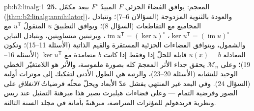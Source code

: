 \begin{solution}{pb:b2:linalg:1}
\textbf{25.} المعجم: يوافق الفضاءَ الجزئي $F$ المبيدُ
$F^\circ$ ببعد مكمّل
(\cref{thm:b2:linalg:annihilator})، والعودة بالثنوية المزدوجة
(السؤالان 6--7)؛ وتتبادل المجاميع مع التقاطعات (السؤال 8)؛
ويوافق التطبيقَ $u$ المنقولُ $u^{\mathsf T}$ مع $\ker u^{\mathsf T}
= (\operatorname{im}u)^\circ$، $\operatorname{im}u^{\mathsf T} =
(\ker u)^\circ$، وبرتبتين متساويتين، وبتبادل
التباين والشمول، وبتوافق الفضاءات الجزئية المستقرة
والقيم الذاتية (الأسئلة 11--15)؛ وتكون المعادلة $u(x) = b$
قابلة للحلّ إذا وفقط إذا كانت $b$ متعامدة مع $\ker u^{\mathsf T}$
(الأسئلة 16--19)؛ وعلى $\mathcal{M}_n$ يحقق جداء الأثر
المعجمَ كله بصورة ملموسة، والأثر هو
اللامتغيّر الخطي الوحيد للتشابه (الأسئلة 20--23)، والرتبة
هي الطول الأدنى لتفكيك إلى موترات أولية
(السؤال 24). وفي البعد غير المنتهي يفشل عدّ الأبعاد
ويحلّ محلّه فرضياتُ \emph{الانغلاق} على
الصور وفرضية التمام --- وعلى فضاءات هيلبرت يصير هذا
مبرهنةَ التمثيل عند ريس ونظريةَ فريدهولم للمؤثرات
المتراصة، مبرهَنةً بأمانة في مجلد السنة الثالثة.
\end{solution}
